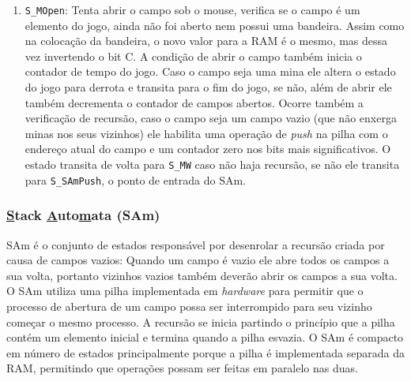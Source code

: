 \documentclass[12pt]{article}
\begin{document}
\begin{enumerate}
\item \verb|S_MOpen|: Tenta abrir o campo sob o mouse, verifica se o campo 
	é um elemento do jogo, ainda não foi aberto nem possui uma bandeira. Assim
	como na colocação da bandeira, o novo valor para a RAM é o mesmo, mas dessa
	vez invertendo o bit C. A condição de abrir o campo também inicia o 
	contador de tempo do jogo. Caso o campo seja uma mina ele altera o estado
	do jogo para derrota e transita para o fim do jogo, se não, além de abrir
	ele também decrementa o contador de campos abertos. Ocorre também a
	verificação de recursão, caso o campo seja um campo vazio (que não enxerga
	minas nos seus vizinhos) ele habilita uma operação de \emph{push} na pilha
	com o endereço atual do campo e um contador zero nos bits mais 
	significativos. O estado transita de volta para \verb|S_MW| caso não haja
	recursão, se não ele transita para \verb|S_SAmPush|, o ponto de entrada do
	SAm.
	
\end{enumerate}


\subsubsection{\underline{S}tack \underline{A}uto\underline{m}ata (SAm)}
\label{sec:sam}

SAm é o conjunto de estados responsável por desenrolar a recursão criada por
causa de campos vazios: Quando um campo é vazio ele abre todos os campos a sua
volta, portanto vizinhos vazios também deverão abrir os campos a sua volta. O
SAm utiliza uma pilha implementada em \emph{hardware} para permitir que o
processo de abertura de um campo possa ser interrompido para seu vizinho
começar o mesmo processo. A recursão se inicia partindo o princípio que a
pilha contém um elemento inicial e termina quando a pilha esvazia. O SAm é
compacto em número de estados principalmente porque a pilha é implementada
separada da RAM, permitindo que operações possam ser feitas em paralelo nas
duas.
\end{document}
